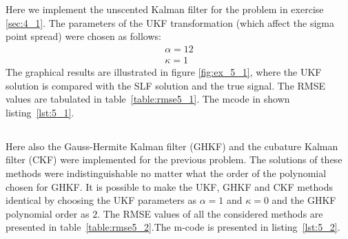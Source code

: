 \documentclass[a4paper,oneside,article]{memoir}
\begin{document}
\clearpage




\section{}

\subsection{}\label{sec:5_1}

Here we implement the unscented Kalman filter for the problem in exercise \ref{sec:4_1}.
The parameters of the UKF transformation (which affect the sigma point spread) were chosen as follows:
\begin{align}
	\alpha = 12\\
	\kappa = 1
\end{align}
The graphical results are illustrated in figure \ref{fig:ex_5_1}, where the UKF solution
is compared with the SLF solution and the true signal. The RMSE values
are tabulated in table~\ref{table:rmse5_1}. The mcode in shown listing~\ref{lst:5_1}. 

\begin{table}[h]
	\centering
	
	\label{table:rmse5_1}
\end{table}



\clearpage





\subsection{}\label{sec:5_2}

Here also the Gauss-Hermite Kalman filter (GHKF) and the cubature Kalman filter (CKF)
were implemented for the previous problem. The solutions of these methods were
indistinguishable no matter what the order of the polynomial chosen for GHKF. It is possible
to make the UKF, GHKF and CKF methods identical by choosing the UKF parameters as $\alpha = 1$ 
and $\kappa=0$ and the GHKF polynomial order as $2$. The RMSE values of all the considered methods
are presented in table~\ref{table:rmse5_2}.The m-code is presented in listing~\ref{lst:5_2}.
\end{document}

